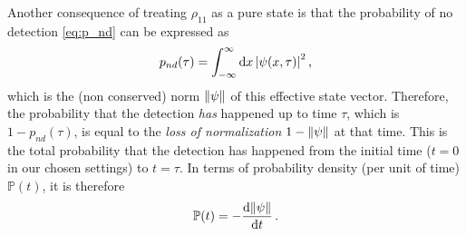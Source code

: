 Another consequence of treating $\rho_{11}$ as a pure state is that the probability of no detection
\eqref{eq:p_nd} can be expressed as
\begin{equation}
  p_{nd}(\tau) = \int_{-\infty}^{\infty} \dd{x} \qty|\psi(x, \tau)|^2 \, \text{,}
\end{equation}
which is the (non conserved) norm $\norm{\psi}$ of this effective state vector.
Therefore, the probability that the detection \emph{has} happened
up to time $\tau$, which is $1 - p_{nd}(\tau)$, is equal to the
\emph{loss of normalization} $1 - \norm{\psi}$ at that time.
This is the total probability that the detection has happened from the initial time
($t=0$ in our chosen settings)
to $t = \tau$. In terms of probability density (per unit of time)
$\mathbb{P}(t)$, it is therefore
\begin{equation}
  \mathbb{P}(t) = - \dv{\norm{\psi}}{t} \,\text{.}
\end{equation}

